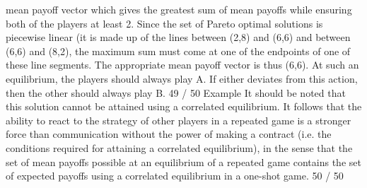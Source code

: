 \documentclass[]{report}
\begin{document}
mean payoff vector which gives the greatest sum of mean payoffs
while ensuring both of the players at least 2.
Since the set of Pareto optimal solutions is piecewise linear (it is
made up of the lines between (2,8) and (6,6) and between (6,6)
and (8,2), the maximum sum must come at one of the endpoints
of one of these line segments.
The appropriate mean payoff vector is thus (6,6). At such an
equilibrium, the players should always play A. If either deviates
from this action, then the other should always play B.
49 / 50
Example
It should be noted that this solution cannot be attained using a
correlated equilibrium.
It follows that the ability to react to the strategy of other players
in a repeated game is a stronger force than communication
without the power of making a contract (i.e. the conditions
required for attaining a correlated equilibrium), in the sense that
the set of mean payoffs possible at an equilibrium of a repeated
game contains the set of expected payoffs using a correlated
equilibrium in a one-shot game.
50 / 50
\end{document}

